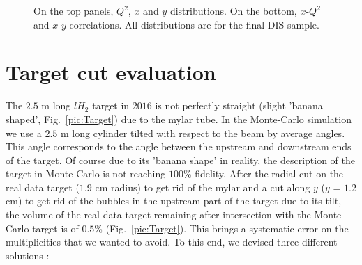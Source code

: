 \begin{figure}[!h]
	\caption{On the top panels, $Q^2$, $x$ and $y$ distributions. On the bottom, $x$-$Q^2$ and $x$-$y$ correlations. All distributions are for the final DIS sample.}
	\label{pic:DISdist}
\end{figure}


\section{Target cut evaluation} \label{sec:targetcut}

The $2.5$ m long $lH_2$ target in $2016$ is not perfectly straight (slight 'banana shaped', Fig.~\ref{pic:Target}) due to the mylar tube. In the Monte-Carlo simulation we use a $2.5$ m long cylinder tilted with respect to the beam by average angles. This angle corresponds to the angle between the upstream and downstream ends of the target. Of course due to its 'banana shape' in reality, the description of the target in Monte-Carlo is not reaching $100$\% fidelity. After the radial cut on the real data target ($1.9$ cm radius) to get rid of the mylar and a cut along $y$ ($y$ = $1.2$ cm) to get rid of the bubbles in the upstream part of the target due to its tilt, the volume of the real data target remaining after intersection with the Monte-Carlo target is of $0.5$\% (Fig.~\ref{pic:Target}). This brings a systematic error on the multiplicities that we wanted to avoid. To this end, we devised three different solutions :

